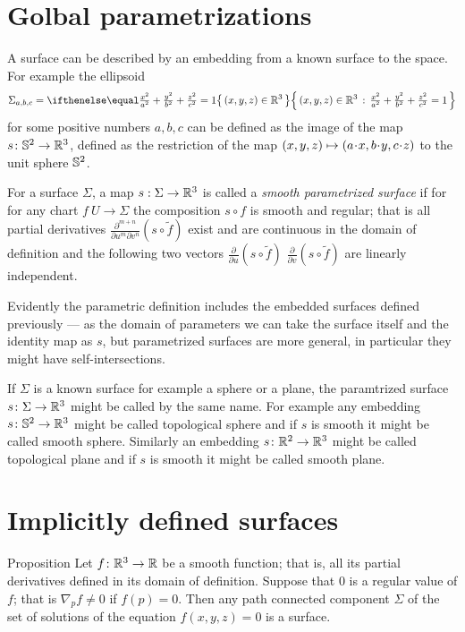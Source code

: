 \section*{Golbal parametrizations} 
A surface can be described by an embedding from a known surface to the space.
For example the ellipsoid
\[\Sigma_{a,b,c}=\set{(x,y,z)\in\RR^3}{\tfrac{x^2}{a^2}+\tfrac{y^2}{b^2}+\tfrac{z^2}{c^2}=1}\]
for some positive numbers $a,b,c$ can be defined as the image of the map $s\colon\mathbb{S}^2\to\mathbb{R}^3$, defined as the restriction of the map $(x,y,z)\z\mapsto (a\cdot x, b\cdot y,c\cdot z)$ to the unit sphere $\mathbb{S}^2$.

For a surface $\Sigma$, a map $s: \Sigma \to \mathbb{R} ^3$ is called a 
\emph{smooth parametrized surface} if for for any chart $f\:U\to \Sigma$ 
the composition $s\circ f$ is smooth and regular;
that is all partial derivatives $\frac{\partial^{m+n}}{\partial u^m\partial v^n}(s\circ \tilde{f})$ exist and are continuous in the domain of definition and the following two vectors 
$\frac{\partial}{\partial u}(s\circ \tilde{f})$ $\frac{\partial}{\partial v}(s\circ \tilde{f})$ are linearly independent.

Evidently the parametric definition includes the embedded surfaces defined previously --- as the domain of parameters we can take the surface itself and the identity map as $s$,
but parametrized surfaces are more general, in particular they  might  have self-intersections.

If $\Sigma$ is a known surface for example a sphere or a plane, the paramtrized surface $s\colon\Sigma\to\mathbb{R}^3$ might be called by the same name.
For example any embedding $s\colon\mathbb{S}^2\to\mathbb{R}^3$ might be called topological sphere
and if $s$ is smooth it might be called smooth sphere.
Similarly an embedding $s\colon\mathbb{R}^2\to\mathbb{R}^3$ might be called topological plane
and if $s$ is smooth it might be called smooth plane.

\section*{Implicitly defined surfaces}

\begin{thm}{Proposition}
Let $f\colon\mathbb{R}^3\to \mathbb{R}$ be a smooth function; 
that is, all its partial derivatives defined in its domain of definition.
Suppose that $0$ is a regular value of $f$;
that is $\nabla_p f\ne 0$ if $f(p)=0$.
Then any path connected component $\Sigma$ of the set of solutions of the equation $f(x,y,z)=0$ is a surface.
\end{thm}

